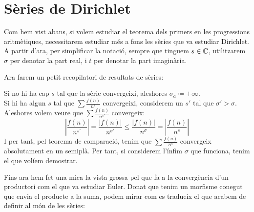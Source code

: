 \chapter{Sèries de Dirichlet}\label{capítol 1: sèries de Dirichlet}
Com hem vist abans, si volem estudiar el teorema dels primers en les progressions aritmètiques, necessitarem estudiar més a fons les sèries que va estudiar
Dirichlet.
A partir d'ara, per simplificar la notació, sempre que tinguem $s\in\mathbb C$, utilitzarem $\sigma$ per denotar la part real, i $t$ per denotar la part imaginària.\par

Ara farem un petit recopilatori de resultats de sèries:
\begin{pf}
    Si no hi ha cap $s$ tal que la sèrie convergeixi, aleshores $\sigma_a\coloneq+\infty$.\\
    Si hi ha algun $s$ tal que $\sum\frac{f(n)}{n^s}$ convergeixi, considerem un $s'$ tal que $\sigma'>\sigma$. Aleshores volem veure que $\sum\frac{f(n)}{n^{s'}}$
    convergeix:
    \[
    \left|\frac{f(n)}{n^{s'}}\right|=\frac{|f(n)|}{n^{\sigma'}}\leq\frac{|f(n)|}{n^{\sigma}}=\left|\frac{f(n)}{n^s}\right|
    \]
    I per tant, pel teorema de comparació, tenim que $\sum\frac{f(n)}{n^s}$ convergeix absolutament en un semiplà. Per tant, si considerem l'ínfim $\sigma$ que
    funciona, tenim el que volíem demostrar.
\end{pf}
Fins ara hem fet una mica la vista grossa pel que fa a la convergència d'un productori com el que va estudiar Euler. 
Donat que tenim un morfisme conegut que envia el producte a la suma, podem mirar com es tradueix el que acabem de definir al món de les sèries:
